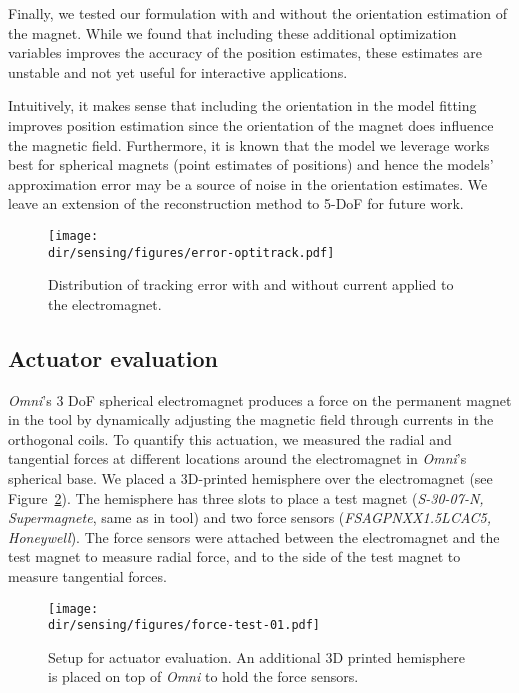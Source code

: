 Finally, we tested our formulation with and without the orientation estimation of the magnet.
While we found that including these additional optimization variables improves the accuracy of the position estimates, these estimates are unstable and not yet useful for interactive applications.

Intuitively, it makes sense that including the orientation in the model fitting improves position estimation since the orientation of the magnet does influence the magnetic field. Furthermore, it is known that the model we leverage \cite{yung1998analytic} works best for spherical magnets (\eg point estimates of positions) and hence the models' approximation error may be a source of noise in the orientation estimates. We leave an extension of the reconstruction method to 5-DoF for future work.
\begin{figure}[!t]
\centering
\texttt{[image: \\dir/sensing/figures/error-optitrack.pdf]}
\caption{Distribution of tracking error with and without current applied to the electromagnet.}
\label{fig:optitrack_eval}
\end{figure}

\subsection{Actuator evaluation}
\textit{Omni}'s 3 DoF spherical electromagnet produces a force on the permanent magnet in the tool by dynamically adjusting the magnetic field through currents in the orthogonal coils.
To quantify this actuation, we measured the radial and tangential forces at different locations around the electromagnet in \textit{Omni}'s spherical base. We placed a 3D-printed hemisphere over the electromagnet (see Figure~\ref{fig:eval_actuator}). The hemisphere has three slots to place a test magnet (\emph{S-30-07-N, Supermagnete}, same as in tool) and two force sensors (\emph{FSAGPNXX1.5LCAC5, Honeywell}). The force sensors were attached between the electromagnet and the test magnet to measure radial force, and to the side of the test magnet to measure tangential forces.
\begin{figure}[!t]
\centering
\texttt{[image: \\dir/sensing/figures/force-test-01.pdf]}
\caption{Setup for actuator evaluation. An additional 3D printed hemisphere is placed on top of \textit{Omni} to hold the force sensors.}
\label{fig:eval_actuator}
\vspace{-1em}
\end{figure}

